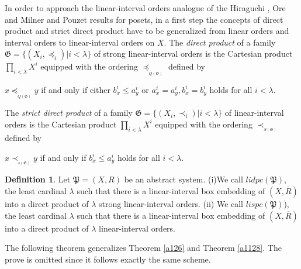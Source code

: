 \documentclass{article}
\theoremstyle{definition}
\newtheorem{definition}{Definition}[section]
\begin{document}
In order to approach the linear-interval orders analogue of the 
Hiraguchi \cite{hir}, Ore \cite{ore} and Milner and Pouzet \cite{MP} results for posets, in a first step the concepts of direct product and strict direct product
have to be generalized from linear orders and interval orders to linear-interval orders
on $X$. 
The {\it direct product} of a family $\mathfrak{G}=\{(X_i,\preceq_i)\vert i<\lambda\}$
of
strong linear-interval orders is the Cartesian product 
$\displaystyle\prod_{i<\lambda}X^i$ equipped with 
the ordering $\preceq_{_{Q(\mathfrak{G})}}$ defined by 
\begin{center}
$x\preceq_{_{Q(\mathfrak{G})}} y$ if and only if 
either
$b_{x}^{i}\leq a_{y}^{i}$ or $a_{x}^{i}=a_{y}^{i}, b_{x}^{i}=b_{y}^{i}$
holds for all $i<\lambda$.
\end{center} 
The {\it strict direct product} of a family $\mathfrak{G}=\{(X_i,\prec_i)\vert i<\lambda\}$
of
linear-interval orders is the Cartesian product 
$\displaystyle\prod_{i<\lambda}X^i$
equipped with 
the ordering $\prec_{_{S(\mathfrak{G})}}$ defined by 
\begin{center}
$x\prec_{_{s(\mathfrak{G})}} y$ if and only if 
$b_{x}^{i}\leq a_{y}^{i}$
holds for all $i<\lambda$.
\end{center}














\begin{definition}\label{a127}{\rm Let $\mathfrak{P} = (X, R)$ be an abstract system. (i)We call $lidpc(\mathfrak{P})$, the least cardinal $\lambda$ such that there is a linear-interval box embedding of $(X,\overline{R})$ into a direct product of $\lambda$ strong linear-interval orders.
(ii) 
We call $lispc(\mathfrak{P})$), the least cardinal $\lambda$ such that there is a linear-interval box embedding of $(X,\overline{R})$ into a direct product of $\lambda$ linear-interval orders.
}
\end{definition}














The following theorem generalizes Theorem \ref{a126} and Theorem \ref{a1128}. The prove is omitted since it follows exactly the same scheme.
\end{document}
